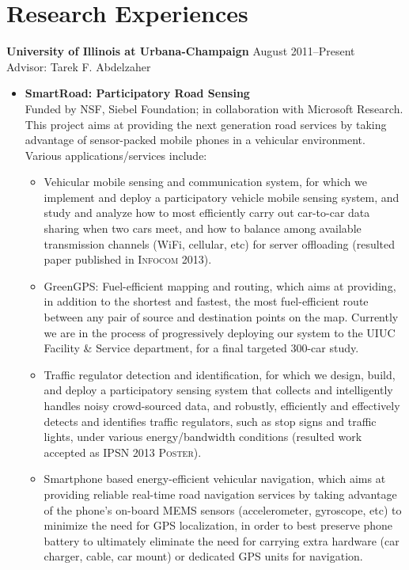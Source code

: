 \section{\sc Research Experiences}
{\bf University of Illinois at Urbana-Champaign} \hfill August 2011--Present\\
Advisor: Tarek F. Abdelzaher
\begin{itemize}
\item \textbf{SmartRoad: Participatory Road Sensing} \\ Funded by NSF,
  Siebel Foundation; in collaboration with Microsoft Research. This
  project aims at providing the next generation road services by
  taking advantage of sensor-packed mobile phones in a vehicular
  environment. Various applications/services include:
\begin{itemize}
\item Vehicular mobile sensing and communication system, for which we
  implement and deploy a participatory vehicle mobile sensing system,
  and study and analyze how to most efficiently carry out car-to-car
  data sharing when two cars meet, and how to balance among available
  transmission channels (WiFi, cellular, etc) for server offloading
  (resulted paper published in \textsc{Infocom 2013}).

\item GreenGPS: Fuel-efficient mapping and routing, which aims at
  providing, in addition to the shortest and fastest, the most
  fuel-efficient route between any pair of source and destination
  points on the map. Currently we are in the process of progressively
  deploying our system to the UIUC Facility \& Service department, for
  a final targeted 300-car study.

\item Traffic regulator detection and identification, for which we
  design, build, and deploy a participatory sensing system that
  collects and intelligently handles noisy crowd-sourced data, and
  robustly, efficiently and effectively detects and identifies traffic
  regulators, such as stop signs and traffic lights, under various
  energy/bandwidth conditions (resulted work accepted as \textsc{IPSN
    2013 Poster}).

\item Smartphone based energy-efficient vehicular navigation, which
  aims at providing reliable real-time road navigation services by
  taking advantage of the phone's on-board MEMS sensors
  (accelerometer, gyroscope, etc) to minimize the need for GPS
  localization, in order to best preserve phone battery to ultimately
  eliminate the need for carrying extra hardware (car charger, cable,
  car mount) or dedicated GPS units for navigation.
\end{itemize}


\end{itemize}
